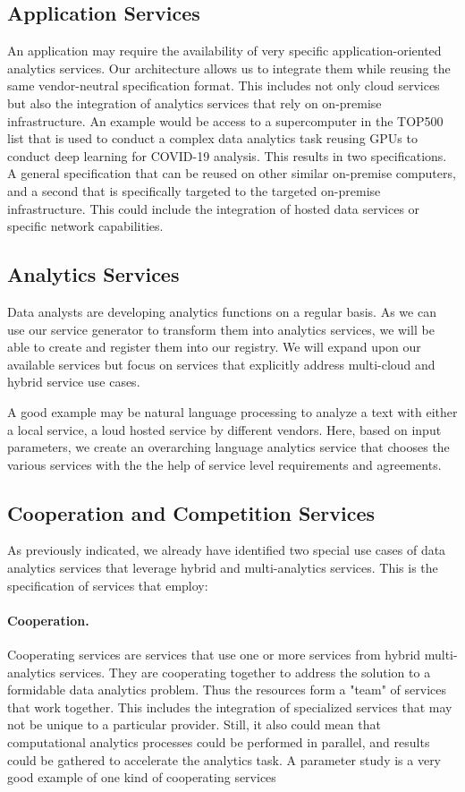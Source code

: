 \subsection{Application Services}

An application may require the availability of very specific
application-oriented analytics services. Our architecture allows us to
integrate them while reusing the same vendor-neutral specification
format. This includes not only cloud services but also the
integration of analytics services that rely on on-premise
infrastructure. An example would be access to a supercomputer in the
TOP500 list that is used to conduct a complex data analytics task
reusing GPUs to conduct deep learning for COVID-19 analysis. This
results in two specifications. A general specification that can be
reused on other similar on-premise computers, and a second that is
specifically targeted to the targeted on-premise infrastructure. This
could include the integration of hosted data services or specific
network capabilities.

\subsection{Analytics Services}

Data analysts are developing analytics functions on a regular
basis. As we can use our service generator to transform them into
analytics services, we will be able to create and register them into
our registry. We will expand upon our available services but focus on
services that explicitly address multi-cloud and hybrid service use
cases.

A good example may be natural language processing to analyze a text
with either a local service, a loud hosted service by different
vendors. Here, based on input parameters, we create an overarching
language analytics service that chooses the various services with the
the help of service level requirements and agreements.

\subsection{Cooperation and Competition Services}

As previously indicated, we already have identified two special use
cases of data analytics services that leverage hybrid and
multi-analytics 
services. This is the specification of services that
employ:


\paragraph{Cooperation.} Cooperating services are services that use one or
more services from hybrid multi-analytics services. They are
cooperating together to address the solution to a formidable data
analytics problem. Thus the resources form a "team" of services that
work together. This includes the integration of specialized services
that may not be unique to a particular provider. Still, it also could
mean that computational analytics processes could be performed in
parallel, and results could be gathered to accelerate the analytics
task. A parameter study is a very good example of one kind of
cooperating services

